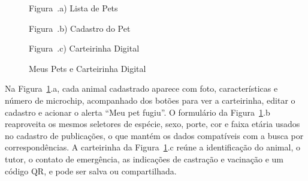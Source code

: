 \begin{figure}[H]
    \centering
    \caption{Meus Pets e Carteirinha Digital}
    \label{fig:tela_meus_pets}
    \vspace{0.15cm}
    \begin{minipage}[t]{0.31\textwidth}
        \centering
        \par\vspace{0.12cm}
        {\small Figura~\thefigure.a) Lista de Pets}
    \end{minipage}
    \hfill
    \begin{minipage}[t]{0.31\textwidth}
        \centering
        \par\vspace{0.12cm}
        {\small Figura~\thefigure.b) Cadastro do Pet}
    \end{minipage}
    \hfill
    \begin{minipage}[t]{0.31\textwidth}
        \centering
        \par\vspace{0.12cm}
        {\small Figura~\thefigure.c) Carteirinha Digital}
    \end{minipage}
    \par\vspace{0.12cm}
\end{figure}

Na Figura~\ref{fig:tela_meus_pets}.a, cada animal cadastrado aparece com foto, características e número de microchip, acompanhado dos botões para ver a carteirinha, editar o cadastro e acionar o alerta ``Meu pet fugiu''. O formulário da Figura~\ref{fig:tela_meus_pets}.b reaproveita os mesmos seletores de espécie, sexo, porte, cor e faixa etária usados no cadastro de publicações, o que mantém os dados compatíveis com a busca por correspondências. A carteirinha da Figura~\ref{fig:tela_meus_pets}.c reúne a identificação do animal, o tutor, o contato de emergência, as indicações de castração e vacinação e um código QR, e pode ser salva ou compartilhada.
